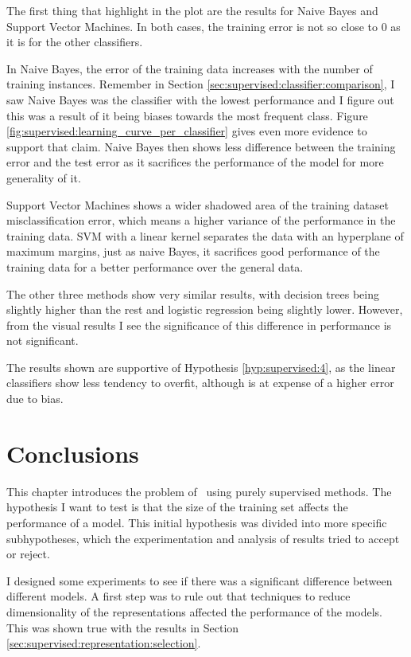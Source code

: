 The first thing that highlight in the plot are the results for Naive Bayes and
Support Vector Machines. In both cases, the training error is not so close to 0
as it is for the other classifiers. 

In Naive Bayes, the error of the training data increases with the number of
training instances. Remember in Section
\ref{sec:supervised:classifier:comparison}, I saw Naive Bayes was the
classifier with the lowest performance and I figure out this was a result of it
being biases towards the most frequent class. Figure
\ref{fig:supervised:learning_curve_per_classifier} gives even more evidence to
support that claim. Naive Bayes then shows less difference between the training
error and the test error as it sacrifices the performance of the model for more
generality of it.

Support Vector Machines shows a wider shadowed area of the training dataset
misclassification error, which means a higher variance of the performance in
the training data. SVM with a linear kernel separates the data with an
hyperplane of maximum margins, just as naive Bayes, it sacrifices good
performance of the training data for a better performance over the general
data.

The other three methods show very similar results, with decision trees being
slightly higher than the rest and logistic regression being slightly lower.
However, from the visual results I see the significance of this difference
in performance is not significant.

The results shown are supportive of Hypothesis \ref{hyp:supervised:4}, as
the linear classifiers show less tendency to overfit, although is at expense
of a higher error due to bias.

\section{Conclusions}\label{sec:supervised:conclusions}

This chapter introduces the problem of \vsd~using purely supervised methods.
The hypothesis I want to test is that the size of the training
set affects the performance of a model. This initial hypothesis was divided
into more specific subhypotheses, which the experimentation and analysis of
results tried to accept or reject.

I designed some experiments to see if there was a significant difference
between different models. A first step was to rule out that techniques to
reduce dimensionality of the representations affected the performance of the
models. This was shown true with the results in Section
\ref{sec:supervised:representation:selection}.

